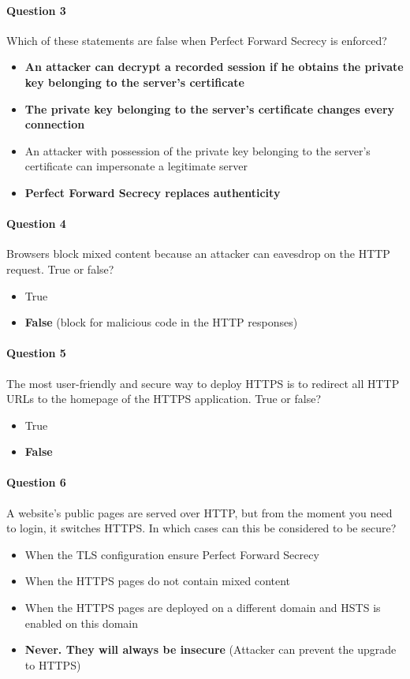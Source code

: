 \documentclass[titlepage]{article}
\begin{document}
    \paragraph{Question 3} Which of these statements are false when Perfect Forward Secrecy is enforced?
    \begin{itemize}
        \item \textbf{An attacker can decrypt a recorded session if he obtains the private key belonging to the server's certificate} \checkmark
        \item \textbf{The private key belonging to the server's certificate changes every connection} \checkmark
        \item An attacker with possession of the private key belonging to the server's certificate can impersonate a legitimate server
        \item \textbf{Perfect Forward Secrecy replaces authenticity} \checkmark
    \end{itemize}
    \paragraph{Question 4} Browsers block mixed content because an attacker can eavesdrop on the HTTP request. True or false?
    \begin{itemize}
        \item True
        \item \textbf{False} \checkmark (block for malicious code in the HTTP responses)
    \end{itemize}
    \paragraph{Question 5} The most user-friendly and secure way to deploy HTTPS is to redirect all HTTP URLs to the homepage of the HTTPS application. True or false?
    \begin{itemize}
        \item True
        \item \textbf{False} \checkmark 
    \end{itemize}
    \paragraph{Question 6} A website's public pages are served over HTTP, but from the moment you need to login, it switches HTTPS. In which cases can this be considered to be secure?
    \begin{itemize}
        \item When the TLS configuration ensure Perfect Forward Secrecy
        \item When the HTTPS pages do not contain mixed content
        \item When the HTTPS pages are deployed on a different domain and HSTS is enabled on this domain
        \item \textbf{Never. They will always be insecure} \checkmark (Attacker can prevent the upgrade to HTTPS)
    \end{itemize}
\end{document}
